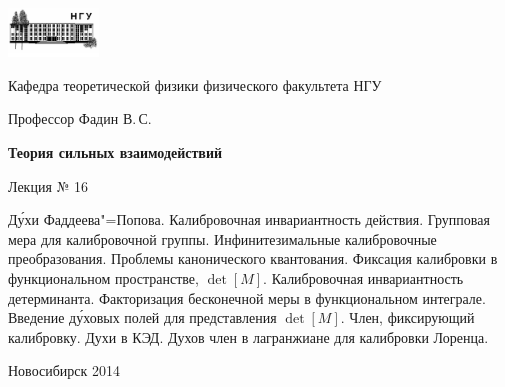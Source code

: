 \documentclass[12pt,pagesize,paper=192mm:108mm]{scrbook}
\begin{document}
\begin{titlepage}
  \vspace*{-1em}
  \begin{center}
    \includegraphics[width=0.18\textwidth]{../NSU-logo}

    Кафедра теоретической физики физического факультета НГУ
    \medskip

    \Large
    Профессор Фадин В.\,С.

    \huge
    \textbf{Теория сильных взаимодействий}
    \smallskip
    
    \Large
    Лекция № 16
    \vfill
    
    \normalsize
    \begin{minipage}{0.77\linewidth}
      Д\'{у}хи Фаддеева"=Попова. Калибровочная инвариантность
      действия. Групповая мера для калибровочной
      группы. Инфинитезимальные калибровочные преобразования. Проблемы
      канонического квантования. Фиксация калибровки в функциональном
      пространстве, $\det[M]$. Калибровочная инвариантность
      детерминанта. Факторизация бесконечной меры в функциональном
      интеграле. Введение д\'{у}ховых полей для представления
      $\det[M]$. Член, фиксирующий калибровку. Духи в КЭД. Духов член
      в лагранжиане для калибровки Лоренца.
    \end{minipage}
    \vfill
    
    \normalsize \ccbysa\hspace{0.5em}  Новосибирск 2014   
  \end{center}
\end{titlepage}
\end{document}
